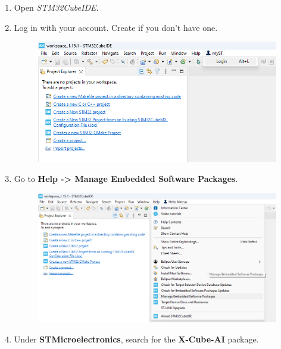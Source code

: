 \documentclass[10pt,a4paper,onecolumn]{article}
\let\textttOrig=\texttt
\def\texttt#1{\expandafter\textttOrig{\seqsplit{#1}}}
\begin{document}
\begin{enumerate}
\def\labelenumi{\arabic{enumi}.}
\item
  Open \textit{STM32CubeIDE}.
\item
  Log in with your \texttt{myST} account. Create if you don't have one.

  \begin{figure}[H]
    \begin{center}
      \includegraphics[width=\dimexpr\textwidth-1cm\relax,height=\dimexpr0.25\textheight-1cm\relax,keepaspectratio]{images/33.png}
    \end{center}
  \end{figure}
\item
  Go to \textbf{Help -\textgreater{} Manage Embedded Software Packages}.

  \begin{figure}[H]
    \begin{center}
      \includegraphics[width=\dimexpr\textwidth-1cm\relax,height=\dimexpr0.25\textheight-1cm\relax,keepaspectratio]{images/34.png}
    \end{center}
  \end{figure}
\item
  Under \textbf{STMicroelectronics}, search for the \textbf{X-Cube-AI}
  package.


\end{enumerate}
\end{document}
